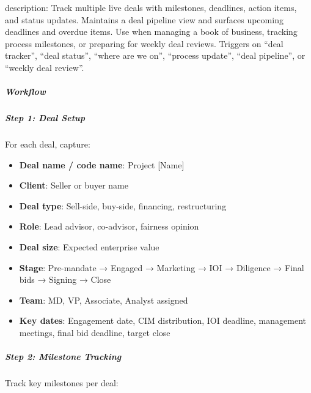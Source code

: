 \documentclass[11pt]{article}
\begin{document}
description: Track multiple live deals with milestones, deadlines, action items, and status updates. Maintains a deal pipeline view and surfaces upcoming deadlines and overdue items. Use when managing a book of business, tracking process milestones, or preparing for weekly deal reviews. Triggers on ``deal tracker'', ``deal status'', ``where are we on'', ``process update'', ``deal pipeline'', or ``weekly deal review''.


\subparagraph{Workflow}\mbox{}\par

\subparagraph{Step 1: Deal Setup}\mbox{}\par

For each deal, capture:

\begin{itemize}[leftmargin=*,itemsep=2pt,topsep=2pt]
\item {} \textbf{Deal name / code name}: Project [Name]
\item {} \textbf{Client}: Seller or buyer name
\item {} \textbf{Deal type}: Sell-side, buy-side, financing, restructuring
\item {} \textbf{Role}: Lead advisor, co-advisor, fairness opinion
\item {} \textbf{Deal size}: Expected enterprise value
\item {} \textbf{Stage}: Pre-mandate → Engaged → Marketing → IOI → Diligence → Final bids → Signing → Close
\item {} \textbf{Team}: MD, VP, Associate, Analyst assigned
\item {} \textbf{Key dates}: Engagement date, CIM distribution, IOI deadline, management meetings, final bid deadline, target close
\end{itemize}

\subparagraph{Step 2: Milestone Tracking}\mbox{}\par

Track key milestones per deal:
\end{document}
